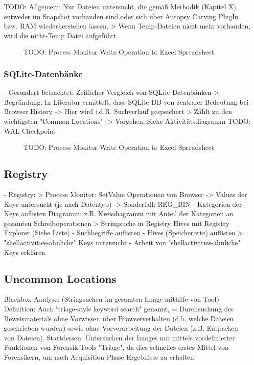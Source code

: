 	TODO:
	Allgemein: Nur Dateien untersucht, die gemäß Methodik (Kapitel X) entweder im Snapshot vorhanden sind oder sich über Autopsy Carving PlugIn bzw. RAM wiederherstellen lassen.
	> Wenn Temp-Dateien nicht mehr vorhanden, wird die nicht-Temp Datei aufgeführt
	
	\begin{figure}[h!]
		\centering
		\small
		\centerline{\resizebox{\linewidth}{!}{}}
		\caption{TODO: Process Monitor Write Operation to Excel Spreadsheet}
		\label{fig:jes}
	\end{figure}

\subsubsection*{SQLite-Datenbänke}
- Gesondert betrachtet: Zeitlicher Vergleich von SQLite Datenbänken
	> Begründung: In Literatur ermittelt, dass SQLite DB von zentraler Bedeutung bei Browser History -> Hier wird i.d.R. Suchverlauf gespeichert
	> Zählt zu den wichtigsten "Common Locations"
	-> Vorgehen: Siehe Aktivitätsdiagramm
		TODO: WAL Checkpoint
		
\begin{figure}[h!]
	\centering
	\small
	\centerline{\resizebox{\linewidth}{!}{}}
	\caption{TODO: Process Monitor Write Operation to Excel Spreadsheet}
	\label{fig:jes}
\end{figure}

\subsection*{Registry}
- Registry:
	> Process Monitor: SetValue Operationen von Browser 
		-> Values der Keys untersucht (je nach Datentyp) -> Sonderfall: REG\_BIN
		- Kategorien der Keys auflisten
		Diagramm: z.B. Kreisdiagramm mit Anteil der Kategorien an gesamten Schreiboperationen
	> Stringsuche in Registry Hives mit Registry Explorer (Siehe Liste)
		- Suchbegriffe auflisten
		- Hives (Speicherorte) auflisten
	> "shellactivities-ähnliche" Keys untersucht
		- Arbeit von "shellactivities-ähnliche" Keys erklären

\subsection{Uncommon Locations}

Blackbox-Analyse: \cite{Bonetti.2014} (Stringsuchen im gesamten Image mithilfe von Tool) 
Definition: Auch "triage-style keyword search" \cite{Horsman.2019} genannt, = Durchsuchung des Beweismaterials ohne 
Vorwissen über Browserverhalten (d.h. welche Dateien geschrieben wurden) sowie ohne Vorverarbeitung der Dateien (z.B. Entpacken von Dateien).
Stattdessen: Untersuchen der Images nur mittels vordefinierter Funktionen von Forensik-Tools
"Triage", da dies schnelles erstes Mittel von Forensikern, um nach Acquisition Phase Ergebnisse zu erhalten

